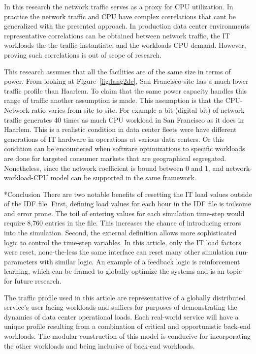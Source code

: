 \documentclass[twocolumn, a4paper,10pt]{article}
\makeatletter
\renewcommand\section{\@startsection{section}{1}{\z@}{0.25cm}{0.1cm}{\normalfont\large\bfseries}}
\makeatother
\begin{document}
In this research the network traffic serves as a proxy for CPU utilization. In practice the network traffic and CPU have complex correlations that can\textsc{}t be generalized with the presented approach. In production data center environments representative correlations can be obtained between network traffic, the IT workloads the the traffic instantiate, and the workload\textsc{}s CPU demand. However, proving such correlations is out of scope of research.

This research assumes that all the facilities are of the same size in terms of power. From looking at Figure~\ref{fig:lang2dc}, San Francisco site has a much lower traffic profile than Haarlem. To claim that the same power capacity handles this range of traffic another assumption is made. This assumption is that the CPU-Network ratio varies from site to site. For example a bit (digital bit) of network traffic generates 40 times as much CPU workload in San Francisco as it does in Haarlem. This is a realistic condition in data center fleets were have different generations of IT hardware in operations at various data centers. Or this condition can be encountered when software optimizations to specific workloads are done for targeted consumer markets that are geographical segregated. Nonetheless, since the network coefficient is bound between 0 and 1, and network-workload-CPU model can be supported in the same framework. 

\section*{Conclusion}
There are two notable benefits of resetting the IT load values outside of the IDF file. First, defining load values for each hour in the IDF file is toilsome and error prone. The toil of entering values for each simulation time-step would require 8,760 entries in the file. This increases the chance of introducing errors into the simulation. Second, the external definition allows more sophisticated logic to control the time-step variables. In this article, only the IT load factors were reset, none-the-less the same interface can reset many other simulation run-parameters with similar logic. An example of a feedback logic is reinforcement learning, which can be framed to globally optimize the systems and is an topic for future research. 

The traffic profile used in this article are representative of a globally distributed service’s user facing workloads and suffices for purposes of demonstrating the dynamics of data center operational loads. Each real-world service will have a unique profile resulting from a combination of critical and opportunistic back-end workloads. The modular construction of this model is conducive for incorporating the other workloads and being inclusive of back-end workloads.





\end{document}
